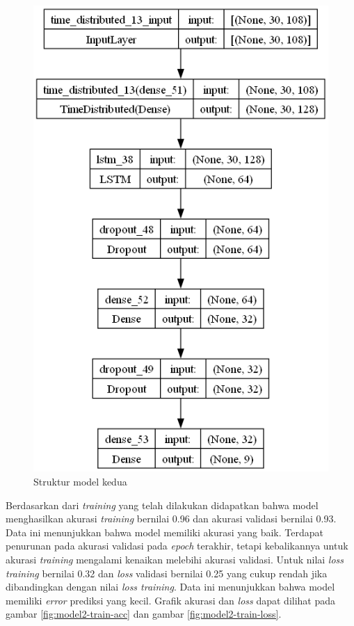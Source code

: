 \begin{figure}[H]
  \centering

  \includegraphics[scale=0.6]{gambar/bab4-uji-model-second-model.png}

  \caption{Struktur model kedua}
  \label{fig:model2-struktur}
\end{figure}

Berdasarkan dari \emph{training} yang telah dilakukan didapatkan bahwa model menghasilkan akurasi \emph{training} bernilai 0.96 dan akurasi validasi bernilai 0.93. Data ini menunjukkan bahwa model memiliki akurasi yang baik. Terdapat penurunan pada akurasi validasi pada \emph{epoch} terakhir, tetapi kebalikannya untuk akurasi \emph{training} mengalami kenaikan melebihi akurasi validasi. Untuk nilai \emph{loss training} bernilai 0.32 dan \emph{loss} validasi bernilai 0.25 yang cukup rendah jika dibandingkan dengan nilai \emph{loss training}. Data ini menunjukkan bahwa model memiliki \emph{error} prediksi yang kecil. Grafik akurasi dan \emph{loss} dapat dilihat pada gambar \ref{fig:model2-train-acc} dan gambar \ref{fig:model2-train-loss}.

